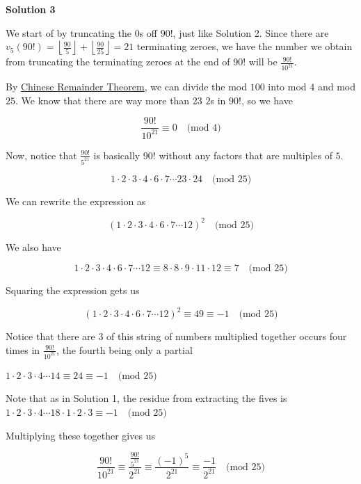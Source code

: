 \begin{enumerate}
 



\textbf{Solution 3}

We start of by truncating the $0$s off $90!$, just like Solution 2. Since there are $v_5(90!) = \left\lfloor\frac{90}{5}\right\rfloor+\left\lfloor\frac{90}{25}\right\rfloor = 21$ terminating zeroes, we have the number we obtain from truncating the terminating zeroes at the end of $90!$ will be $\frac{90!}{10^{21}}$.

 By \href{https://artofproblemsolving.com/wiki/index.php?title=Chinese\_Remainder\_Theorem}{Chinese Remainder Theorem}, we can divide the mod $100$ into mod $4$ and mod $25$. We know that there are way more than $23$ $2$s in $90!$, so we have

 
 \[\dfrac{90!}{10^{21}} \equiv 0 \text{ } \text{ (mod } 4 \text{)}\]

 Now, notice that $\frac{90!}{5^{21}}$ is basically $90!$ without any factors that are multiples of $5$.

 
 \[1\cdot 2\cdot 3\cdot 4\cdot 6\cdot 7\cdots 23\cdot 24 \text{ } \text{ (mod } 25 \text{)}\]

 We can rewrite the expression as 

 
 \[(1\cdot 2\cdot 3\cdot 4\cdot 6\cdot 7\cdots 12)^2 \text{ } \text{ (mod } 25 \text{)}\]

 We also have 

 
 \[1\cdot 2\cdot 3\cdot 4\cdot 6\cdot 7\cdots 12 \equiv 8\cdot 8\cdot 9\cdot 11\cdot 12 \equiv 7 \text{ } \text{ (mod } 25 \text{)}\]

 Squaring the expression gets us

 
 \[(1\cdot 2\cdot 3\cdot 4\cdot 6\cdot 7\cdots 12)^2 \equiv 49 \equiv -1 \text{ } \text{ (mod } 25 \text{)}\]

 Notice that there are $3$ of this string of numbers multiplied together occurs four times in $\frac{90!}{10^{21}}$, the fourth being only a partial

 $1\cdot 2\cdot 3\cdot 4\cdots 14 \equiv 24 \equiv -1 \text{ } \text{ (mod } 25 \text{)}$

 Note that as in Solution 1, the residue from extracting the fives is$1\cdot 2\cdot 3\cdot 4\cdots 18 \cdot 1 \cdot 2 \cdot 3 \equiv -1 \text{ } \text{ (mod } 25 \text{)}$

 Multiplying these together gives us

 
 \[\frac{90!}{10^{21}} \equiv \frac{\frac{90!}{5^{21}}}{2^{21}} \equiv \frac{(-1)^5}{2^{21}} \equiv \frac{-1}{2^{21}} \text{ } \text{ (mod } 25 \text{)}\]


\end{enumerate}
